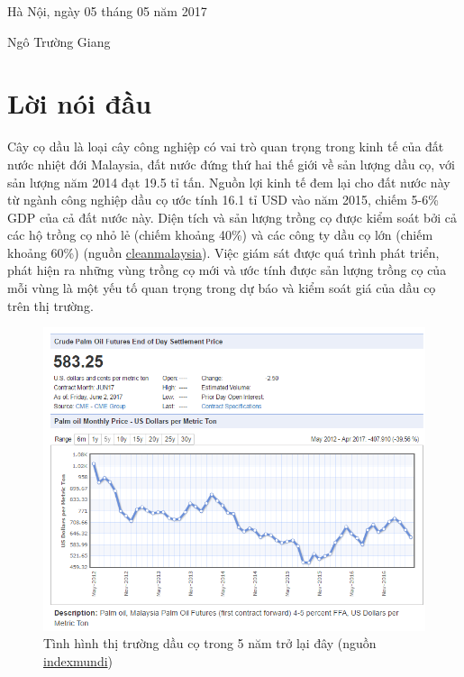 \documentclass[14pt, oneside, a4paper, openany]{scrartcl}
\begin{document}
\begin{flushright}
	Hà Nội, ngày 05 tháng 05 năm 2017
\end{flushright}
\hspace{95 mm}Ngô Trường Giang

\newpage
\section{Lời nói đầu}
Cây cọ dầu là loại cây công nghiệp có vai trò quan trọng trong kinh tế của đất nước nhiệt đới Malaysia, đất nước đứng thứ hai thế giới về sản lượng dầu cọ, với sản lượng năm 2014 đạt 19.5 tỉ tấn. Nguồn lợi kinh tế đem lại cho đất nước này từ ngành công nghiệp dầu cọ ước tính 16.1 tỉ USD vào năm 2015, chiếm 5-6\% GDP của cả đất nước này. 
Diện tích và sản lượng trồng cọ được kiểm soát bởi cả các hộ trồng cọ nhỏ lẻ (chiếm khoảng 40\%) và các công ty dầu cọ lớn (chiếm khoảng 60\%) (nguồn \href{http://cleanmalaysia.com/2015/12/09/just-how-big-is-malaysias-palm-oil-industry/}{cleanmalaysia}).
Việc giám sát được quá trình phát triển, phát hiện ra những vùng trồng cọ mới và ước tính được sản lượng trồng cọ của mỗi vùng là một yếu tố quan trọng trong dự báo và kiểm soát giá của dầu cọ trên thị trường.

\begin{figure}[!h]
	\centering
	\includegraphics[scale=0.8]{figures/oilPalmMarket.png} 
	\caption[Tình hình thị trường dầu cọ trong 5 năm trở lại đây]{Tình hình thị trường dầu cọ trong 5 năm trở lại đây (nguồn \href{http://www.indexmundi.com/commodities/?commodity=palm-oil&months=60}{indexmundi})}
\end{figure}
\end{document}
